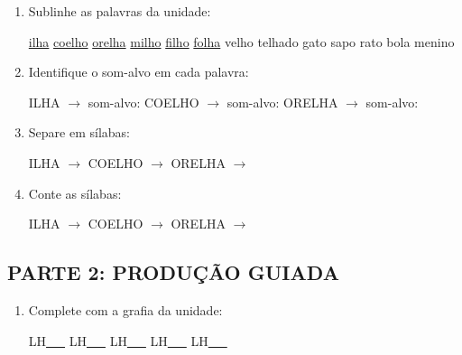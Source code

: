 \begin{exercicio}
\begin{enumerate}
  \item Sublinhe as palavras da unidade:

\begin{center}
  \uline{ilha} \quad \uline{coelho} \quad \uline{orelha} \quad \uline{milho} \quad \uline{filho} \quad \uline{folha} \quad velho \quad telhado \quad gato \quad sapo \quad rato \quad bola \quad menino
\end{center}

  \item Identifique o som-alvo em cada palavra:
  \begin{center}
  ILHA $\rightarrow$ som-alvo: \underline{\hspace{1cm}} \quad COELHO $\rightarrow$ som-alvo: \underline{\hspace{1cm}} \quad ORELHA $\rightarrow$ som-alvo: \underline{\hspace{1cm}}
  \end{center}

  \item Separe em sílabas:
  \begin{center}
  ILHA $\rightarrow$ \underline{\hspace{1cm}} \quad COELHO $\rightarrow$ \underline{\hspace{1cm}} \quad ORELHA $\rightarrow$ \underline{\hspace{1cm}}
  \end{center}

  \item Conte as sílabas:
  \begin{center}
  ILHA $\rightarrow$ \underline{\hspace{0.9cm}} \quad COELHO $\rightarrow$ \underline{\hspace{0.9cm}} \quad ORELHA $\rightarrow$ \underline{\hspace{0.9cm}}
  \end{center}

\end{enumerate}

\subsection*{PARTE 2: PRODUÇÃO GUIADA}

\begin{enumerate}[resume]

  \item Complete com a grafia da unidade:
  \begin{center}
  LH\underline{~~~} \quad LH\underline{~~~} \quad LH\underline{~~~} \quad LH\underline{~~~} \quad LH\underline{~~~}
  \end{center}


\end{enumerate}
\end{exercicio}
